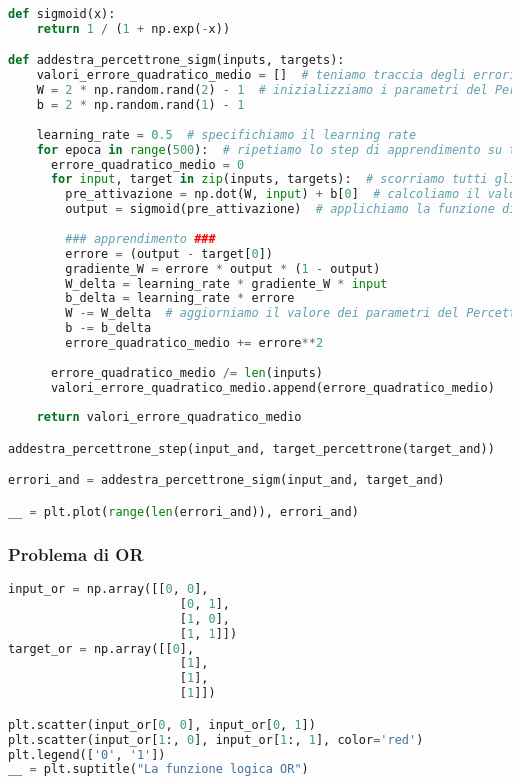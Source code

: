 \documentclass[12pt, a4paper]{article}
\begin{document}
\begin{lstlisting}[language=Python, caption=Funzione di Attivazione Sigmoidea e Output dei Risultati]
def sigmoid(x):
    return 1 / (1 + np.exp(-x))

def addestra_percettrone_sigm(inputs, targets):
    valori_errore_quadratico_medio = []  # teniamo traccia degli errori del modello
    W = 2 * np.random.rand(2) - 1  # inizializziamo i parametri del Percettrone da una distribuzione uniforme in [-1, 1]
    b = 2 * np.random.rand(1) - 1
  
    learning_rate = 0.5  # specifichiamo il learning rate
    for epoca in range(500):  # ripetiamo lo step di apprendimento su tutti gli esempi per 500 volte
      errore_quadratico_medio = 0
      for input, target in zip(inputs, targets):  # scorriamo tutti gli esempi
        pre_attivazione = np.dot(W, input) + b[0]  # calcoliamo il valore di pre-attivazione
        output = sigmoid(pre_attivazione)  # applichiamo la funzione di attivazione per calcolare l'output
  
        ### apprendimento ###
        errore = (output - target[0])
        gradiente_W = errore * output * (1 - output)
        W_delta = learning_rate * gradiente_W * input
        b_delta = learning_rate * errore
        W -= W_delta  # aggiorniamo il valore dei parametri del Percettrone
        b -= b_delta
        errore_quadratico_medio += errore**2
        
      errore_quadratico_medio /= len(inputs)
      valori_errore_quadratico_medio.append(errore_quadratico_medio)
    
    return valori_errore_quadratico_medio

addestra_percettrone_step(input_and, target_percettrone(target_and))

errori_and = addestra_percettrone_sigm(input_and, target_and)

__ = plt.plot(range(len(errori_and)), errori_and)
\end{lstlisting}

\subsubsection{Problema di OR}
\begin{lstlisting}[language=Python, caption=Inizializzazione]
input_or = np.array([[0, 0],
                        [0, 1],
                        [1, 0],
                        [1, 1]])
target_or = np.array([[0],
                        [1],
                        [1],
                        [1]])

plt.scatter(input_or[0, 0], input_or[0, 1])
plt.scatter(input_or[1:, 0], input_or[1:, 1], color='red')
plt.legend(['0', '1'])
__ = plt.suptitle("La funzione logica OR")
\end{lstlisting}

\end{document}
